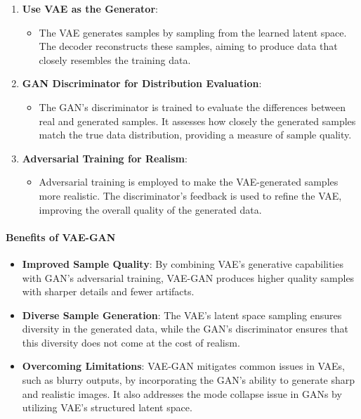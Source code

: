 \documentclass[11pt]{article}
\providecommand{\tightlist}{%
      \setlength{\itemsep}{0pt}\setlength{\parskip}{0pt}}
\begin{document}
\begin{enumerate}
\def\labelenumi{\arabic{enumi}.}
\tightlist
\item
  \textbf{Use VAE as the Generator}:

  \begin{itemize}
  \tightlist
  \item
    The VAE generates samples by sampling from the learned latent space.
    The decoder reconstructs these samples, aiming to produce data that
    closely resembles the training data.
  \end{itemize}
\item
  \textbf{GAN Discriminator for Distribution Evaluation}:

  \begin{itemize}
  \tightlist
  \item
    The GAN's discriminator is trained to evaluate the differences
    between real and generated samples. It assesses how closely the
    generated samples match the true data distribution, providing a
    measure of sample quality.
  \end{itemize}
\item
  \textbf{Adversarial Training for Realism}:

  \begin{itemize}
  \tightlist
  \item
    Adversarial training is employed to make the VAE-generated samples
    more realistic. The discriminator's feedback is used to refine the
    VAE, improving the overall quality of the generated data.
  \end{itemize}
\end{enumerate}

\paragraph{Benefits of VAE-GAN}\label{benefits-of-vae-gan}

\begin{itemize}
\tightlist
\item
  \textbf{Improved Sample Quality}: By combining VAE's generative
  capabilities with GAN's adversarial training, VAE-GAN produces higher
  quality samples with sharper details and fewer artifacts.
\item
  \textbf{Diverse Sample Generation}: The VAE's latent space sampling
  ensures diversity in the generated data, while the GAN's discriminator
  ensures that this diversity does not come at the cost of realism.
\item
  \textbf{Overcoming Limitations}: VAE-GAN mitigates common issues in
  VAEs, such as blurry outputs, by incorporating the GAN's ability to
  generate sharp and realistic images. It also addresses the mode
  collapse issue in GANs by utilizing VAE's structured latent space.
\end{itemize}
\end{document}
